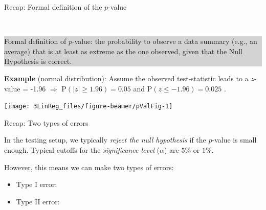 \documentclass[10pt,ignorenonframetext,]{beamer}
\begin{document}
\begin{frame}

\begin{block}{Recap: Formal definition of the \(p\)-value}

\(~\)

\colorbox{lightgray}{\begin{minipage}{10cm}
Formal definition of $p$-value: the probability to observe a data summary (e.g., an average) that is at least as extreme as the one observed, given that the Null Hypothesis is correct.
\end{minipage}}

\vspace{3mm}

\textbf{Example} (normal distribution): Assume the observed
test-statistic leads to a \(z\)-value = -1.96 \(\Rightarrow\)
\(\text{P}(|z|\geq 1.96)=0.05\) and \(\text{P}(z\leq-1.96)=0.025\) .

\vspace{1mm}

\begin{center}\texttt{[image: 3LinReg\_files/figure-beamer/pValFig-1]} \end{center}

\end{block}

\end{frame}

\begin{frame}

\begin{block}{Recap: Two types of errors}

\vspace{2mm}

In the testing setup, we typically \emph{reject the null hypothesis} if
the \(p\)-value is small enough. Typical cutoffs for the
\emph{significance level} (\(\alpha\)) are \(5\%\) or \(1\%\).

\vspace{2mm}

However, this means we can make two types of errors: \vspace{2mm}

\begin{itemize}
\item
  Type I error:
\item
  Type II error:
\end{itemize}

\vspace{2mm}

\end{block}

\end{frame}
\end{document}
